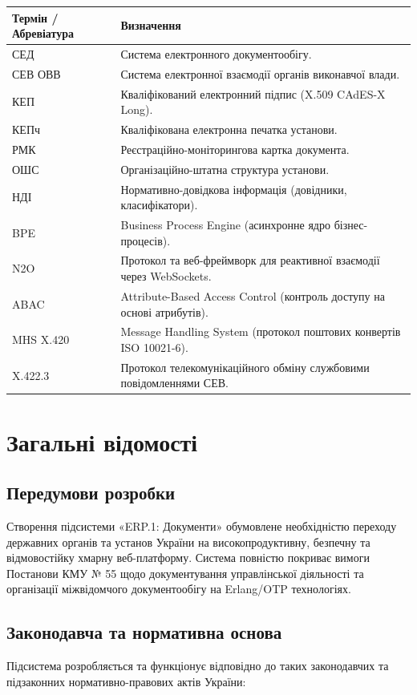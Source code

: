 \documentclass{article}
\begin{document}
\begin{longtable}{p{3.5cm}p{10.5cm}}
\toprule
\textbf{Термін / Абревіатура} & \textbf{Визначення} \\
\midrule
СЕД & Система електронного документообігу. \\
СЕВ ОВВ & Система електронної взаємодії органів виконавчої влади. \\
КЕП & Кваліфікований електронний підпис (X.509 CAdES-X Long). \\
КЕПч & Кваліфікована електронна печатка установи. \\
РМК & Реєстраційно-моніторингова картка документа. \\
ОШС & Організаційно-штатна структура установи. \\
НДІ & Нормативно-довідкова інформація (довідники, класифікатори). \\
BPE & Business Process Engine (асинхронне ядро бізнес-процесів). \\
N2O & Протокол та веб-фреймворк для реактивної взаємодії через WebSockets. \\
ABAC & Attribute-Based Access Control (контроль доступу на основі атрибутів). \\
MHS X.420 & Message Handling System (протокол поштових конвертів ISO 10021-6). \\
X.422.3 & Протокол телекомунікаційного обміну службовими повідомленнями СЕВ. \\
\bottomrule
\end{longtable}

\section{Загальні відомості}

\subsection{Передумови розробки}
Створення підсистеми «ERP.1: Документи» обумовлене необхідністю переходу державних органів та установ України на високопродуктивну, безпечну та відмовостійку хмарну веб-платформу. Система повністю покриває вимоги Постанови КМУ № 55 щодо документування управлінської діяльності та організації міжвідомчого документообігу на Erlang/OTP технологіях.

\subsection{Законодавча та нормативна основа}
Підсистема розробляється та функціонує відповідно до таких законодавчих та підзаконних нормативно-правових актів України:
\end{document}
